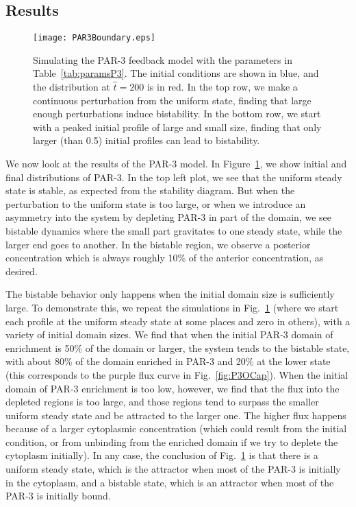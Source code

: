\documentclass[11pt]{article}
\newcommand{\6}[1]{#1_{\text{6}}}
\newcommand{\3}[1]{#1_{\text{3}}}
\begin{document}
\subsection{Results}
\begin{figure}
\centering
\texttt{[image: PAR3Boundary.eps]}
\caption{\label{fig:P3FBBd}Simulating the PAR-3 feedback model with the parameters in Table\ \ref{tab:paramsP3}. The initial conditions are shown in blue, and the distribution at $\hat t = 200$ is in red. In the top row, we make a continuous perturbation from the uniform state, finding that large enough perturbations induce bistability. In the bottom row, we start with a peaked initial profile of large and small size, finding that only larger (than 0.5) initial profiles can lead to bistability.}
\end{figure}

We now look at the results of the PAR-3 model. In Figure\ \ref{fig:P3FBBd}, we show initial and final distributions of PAR-3. In the top left plot, we see that the uniform steady state is stable, as expected from the stability diagram. But when the perturbation to the uniform state is too large, or when we introduce an asymmetry into the system by depleting PAR-3 in part of the domain, we see bistable dynamics where the small part gravitates to one steady state, while the larger end goes to another. In the bistable region, we observe a posterior concentration which is always roughly 10\% of the anterior concentration, as desired.

The bistable behavior only happens when the initial domain size is sufficiently large. To demonstrate this, we repeat the simulations in Fig.\ \ref{fig:P3FBBd} (where we start each profile at the uniform steady state at some places and zero in others), with a variety of initial domain sizes. We find that when the initial PAR-3 domain of enrichment is 50\% of the domain or larger, the system tends to the bistable state, with about 80\% of the domain enriched in PAR-3 and 20\% at the lower state (this corresponds to the purple flux curve in Fig.\ \ref{fig:P3OCap}). When the initial domain of PAR-3 enrichment is too low, however, we find that the flux into the depleted regions is too large, and those regions tend to surpass the smaller uniform steady state and be attracted to the larger one. The higher flux happens because of a larger cytoplasmic concentration (which could result from the initial condition, or from unbinding from the enriched domain if we try to deplete the cytoplasm initially). In any case, the conclusion of Fig.\ \ref{fig:P3FBBd} is that there is a uniform steady state, which is the attractor when most of the PAR-3 is initially in the cytoplasm, and a bistable state, which is an attractor when most of the PAR-3 is initially bound. 
\end{document}
